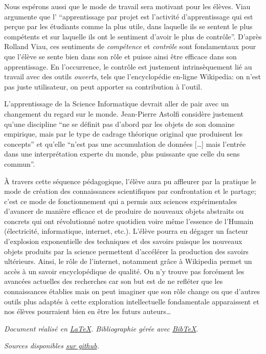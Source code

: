 \documentclass[11pt,bibliography=totoc]{scrartcl}
\begin{document}
Nous espérons aussi que le mode de travail sera motivant pour les élèves. Viau
\cite{viau} argumente que l' ``apprentissage par projet est l'activité
d'apprentissage qui est perçue par les étudiants comme la plus utile, dans
laquelle ils se sentent le plus compétents et sur laquelle ils ont le sentiment
d'avoir le plus de contrôle''. D'après Rolland Viau, ces sentiments de
\textit{compétence} et \textit{contrôle} sont fondamentaux pour que l'élève se
sente bien dans son rôle et puisse ainsi être efficace dans son apprentissage.
En l'occurrence, le contrôle est justement intrinsèquement lié au travail avec
des outils \textit{ouverts}, tels que l'encyclopédie en-ligne Wikipedia: on
n'est pas juste utilisateur, on peut apporter sa contribution à l'outil.

L'apprentissage de la Science Informatique devrait aller de pair avec un
changement du regard sur le monde. Jean-Pierre Astolfi \cite{astolfi} considère
justement qu'une discipline ``ne se définit pas d'abord par les objets de son
domaine empirique, mais par le type de cadrage théorique original que produisent
les concepts'' et qu'elle ``n'est pas une accumulation de données [\ldots] mais
l'entrée dans une interprétation experte du monde, plus puissante que celle du
sens commun''.

À travers cette séquence pédagogique, l'élève aura pu affleurer par la pratique
le mode de création des connaissances scientifiques par confrontation et
le partage; c'est ce mode de fonctionnement qui a permis aux sciences
expérimentales d'avancer de manière efficace et de produire de nouveaux objets
abstraits ou concrets qui ont révolutionné notre quotidien voire même l'essence
de l'Humain (électricité, informatique, internet, etc.). L'élève pourra en
dégager un facteur d'explosion exponentielle des techniques et des savoirs
puisque les nouveaux objets produits par la science permettent d'accélérer la
production des savoirs ultérieurs. Ainsi, le rôle de l'internet, notamment grâce
à Wikipedia permet un accès à un savoir encyclopédique de qualité. On n'y trouve
pas forcément les avancées actuelles des recherches car son but est de ne
refléter que les connaissances établies mais on peut imaginer que son rôle
change ou que d'autres outils plus adaptés à cette exploration intellectuelle
fondamentale apparaissent et nos élèves pourraient bien en être les futurs
auteurs\ldots

\pagebreak
\printbibliography  %
\vfill
\emph{Document réalisé en \href{https://www.latex-project.org/}{\LaTeX}.
  Bibliographie gérée avec \href{http://www.bibtex.org/}{Bib\TeX}}.\par
\emph{Sources disponibles \href{https://github.com/Dalker/didac_010}{sur github}.}
\end{document}

